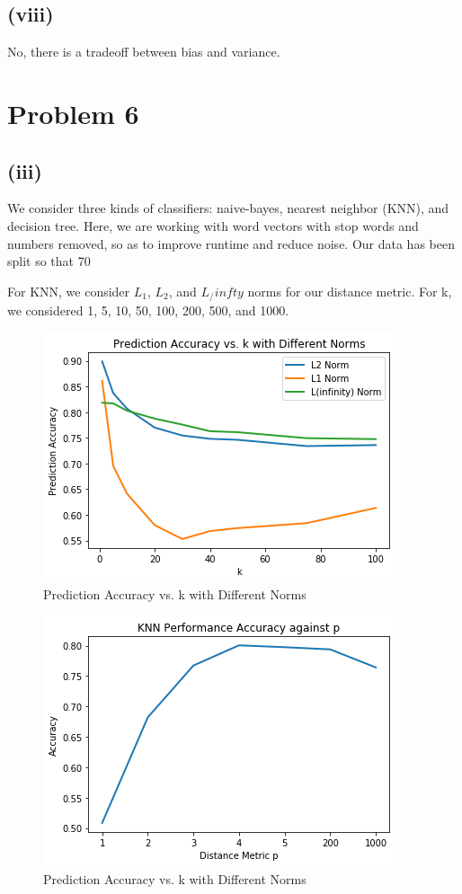 \documentclass[twoside,11pt]{homework}
\begin{document}
\subsection*{(viii)}  
	No, there is a tradeoff between bias and variance.


\section*{Problem 6}
\subsection*{(iii)}
	We consider three kinds of classifiers: naive-bayes, nearest neighbor (KNN), and decision tree. Here, we are working with word vectors with stop words and numbers removed, so as to improve runtime and reduce noise. Our data has been split so that 70%
	
	For KNN, we consider $L_1$, $L_2$, and $L_/infty$ norms for our distance metric. For k, we considered 1, 5, 10, 50, 100, 200, 500, and 1000.
	
		\begin{figure}[H]
		\centering
		\includegraphics[scale=.5]{q6_fig/knn_k.png}	
		\caption{Prediction Accuracy vs. k with Different Norms}
	\end{figure}

	\begin{figure}[H]
		\centering
		\includegraphics[scale=.5]{q6_fig/performance_vs_p.png}	
		\caption{Prediction Accuracy vs. k with Different Norms}
	\end{figure}
	
\end{document}
